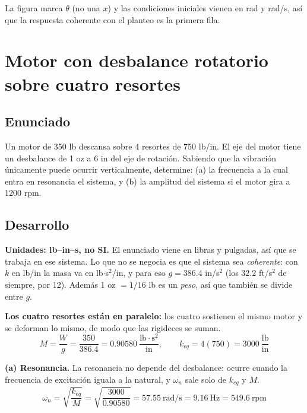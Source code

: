 \documentclass[12pt,letterpaper]{article}
\begin{document}
La figura marca $\theta$ (no una $x$) y las condiciones iniciales vienen en rad y
rad/s, así que la respuesta coherente con el planteo es la primera fila.

\newpage
\section{Motor con desbalance rotatorio sobre cuatro resortes}

\subsection{Enunciado}

Un motor de 350 lb descansa sobre 4 resortes de 750 lb/in. El eje del motor tiene un
desbalance de 1 oz a 6 in del eje de rotación. Sabiendo que la vibración únicamente
puede ocurrir verticalmente, determine: (a) la frecuencia a la cual entra en
resonancia el sistema, y (b) la amplitud del sistema si el motor gira a 1200 rpm.

\subsection{Desarrollo}

\textbf{Unidades: lb--in--s, no SI.} El enunciado viene en libras y pulgadas, así que
se trabaja en ese sistema. Lo que no se negocia es que el sistema sea \emph{coherente}:
con $k$ en lb/in la masa va en lb$\cdot$s$^2$/in, y para eso $g = 386.4$ in/s$^2$ (los
32.2 ft/s$^2$ de siempre, por 12). Además 1 oz $= 1/16$ lb es un \emph{peso}, así que
también se divide entre $g$.

\textbf{Los cuatro resortes están en paralelo:} los cuatro sostienen el mismo motor y
se deforman lo mismo, de modo que las rigideces se suman.
\begin{equation}
M = \frac{W}{g} = \frac{350}{386.4} = 0.90580\ \frac{\text{lb}\cdot\text{s}^2}{\text{in}},
\qquad
k_{eq} = 4(750) = 3000\ \frac{\text{lb}}{\text{in}}
\end{equation}

\textbf{(a) Resonancia.} La resonancia no depende del desbalance: ocurre cuando la
frecuencia de excitación iguala a la natural, y $\omega_n$ sale solo de $k_{eq}$ y $M$.
\begin{equation}
\omega_n = \sqrt{\frac{k_{eq}}{M}} = \sqrt{\frac{3000}{0.90580}} = 57.55\ \text{rad/s}
= 9.16\ \text{Hz} = 549.6\ \text{rpm}
\end{equation}
\end{document}
